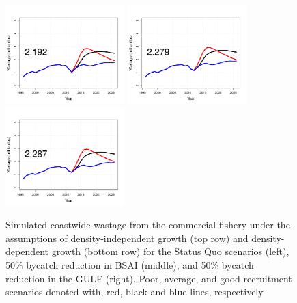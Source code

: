 \begin{figure}[htbp]
		\includegraphics[height=1.5in]{../FIGURES/fig_SQUO_DD_WBio.pdf}
		\includegraphics[height=1.5in]{../FIGURES/fig_BSAI_DD_WBio.pdf}
		\includegraphics[height=1.5in]{../FIGURES/fig_GULF_DD_WBio.pdf}
	\caption{Simulated coastwide wastage from the commercial fishery under the assumptions of density-independent growth (top row) and density-dependent growth (bottom row) for the Status Quo scenarios (left), 50\% bycatch reduction in BSAI (middle), and 50\% bycatch reduction in the GULF (right).  Poor, average, and good recruitment scenarios denoted with, red, black and blue lines, respectively.}
	\label{fig:FIGURES_fig_SQUO_DI_WBio}
\end{figure}
























